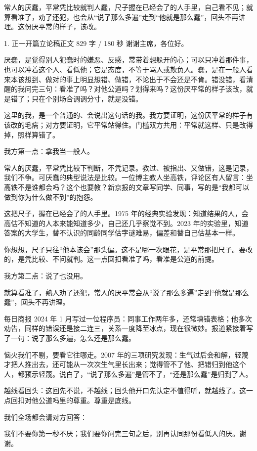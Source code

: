 \documentclass[script,pro]{debate}
\begin{document}
\debatetitle
\begin{thesisbox}[全场一句话立论]常人的厌蠢，平常凭比较就判人蠢，尺子握在已经会了的人手里，自己看不见；就算看准了，劝了还犯，也会从“说了那么多遍”走到“他就是那么蠢”，回头不再讲理。这份厌平常的样子，该改。\end{thesisbox}

\begin{speech}{1. 正一开篇立论稿}{正文 829 字 / 180 秒}
谢谢主席，各位好。

厌蠢，是觉得别人犯蠢时的嫌恶、反感，常带着想躲开的心；可以只冲着那件事，也可以冲着这个人、看低他；它是态度，不等于骂人或欺负人。蠢，是在一般人看来本该想到、做对的事上明显想错、做错，不论出于不会还是不肯。错没错，看清醒的我问完三句：看准了吗？对他公道吗？划得来吗？这份厌平常的样子该改，就是错了；只在个别场合调调分寸，就是没错。

这里的我，是一个普通的、会说出这句话的我。我方要证明，这份厌平常的样子有该改的毛病；对方要证明，它平常站得住。门槛双方共用：平常就这样、只是改得掉，照样算错了。

我方第一点：拿我当一般人。

常人的厌蠢，平常凭比较下判断，不凭记录。教过、被指出、又做错，这是记录，我们不争。可厌蠢的典型说法是比较。一位博主教人坐高铁，评论区有人留言：坐高铁不是谁都会吗？这个也要教？新京报的文章写同学、同事，写的是“我都可以做到你为什么做不到”的抱怨。

这把尺子，握在已经会了的人手里。1975 年的经典实验发现：知道结果的人，会高估不知道的人本来能知道多少，自己还几乎察觉不到。2023 年的实验里，知道答案的大学生，替不认识的同龄同学估字谜难易，偏差和替自己估基本一样。

你想想，尺子只往“他本该会”那头偏。这不是哪一次眼花，是平常那把尺子。要改的，是凭比较、不问就判。这一点回扣看准了吗，看准是公道的前提。

我方第二点：说了也没用。

就算看准了，熟人劝了还犯，常人的厌平常会从“说了那么多遍”走到“他就是那么蠢”，回头不再讲理。

每日商报 2024 年 1 月写过一位程序员：同事工作两年多，还常填错表格；他多次劝告，同样的错误还是接二连三，关系一度降至冰点，现在很微妙。报道紧接着写了一句：说了那么多遍，怎么还是那么蠢。

恼火我们不剔，要看它往哪走。2007 年的三项研究发现：生气过后会和解，轻蔑才把人推出去，还可能从一次次生气里长出来；觉得管不了他、把错归到他这个人，都预示轻蔑。说白了，“说了那么多遍”是管不了，“还是那么蠢”是归到了人。

越线看回头：这回先不说，不越线；回头他开口先认定不值得听，就越线了。这一点回扣对他公道吗里的尊重。尊重是底线。

我们全场都会请对方回答：

我们不要你第一秒不厌；我们要你问完三句之后，别再认同那份看低人的厌。谢谢。
\end{speech}
\end{document}
